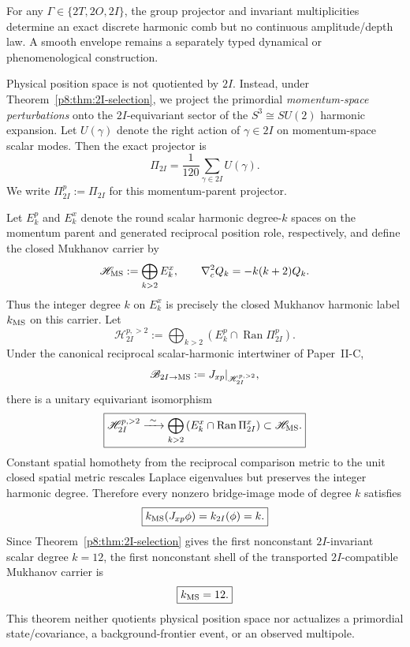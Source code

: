 \documentclass[12pt,a4paper]{article}
\begin{document}
\begin{remark}
\label{p8:rem:v236-no-finite-envelope}
For any \(\Gamma\in\{2T,2O,2I\}\), the group projector and invariant
multiplicities determine an exact discrete harmonic comb but no continuous
amplitude/depth law.  A smooth envelope remains a separately typed dynamical
or phenomenological construction.
\end{remark}


Physical position space is not quotiented by \(2I\).  Instead, under Theorem~\ref{p8:thm:2I-selection}, we project the primordial \emph{momentum-space perturbations} onto the \(2I\)-equivariant sector of the \(S^3\cong SU(2)\) harmonic expansion. Let \(U(\gamma)\) denote the right action of \(\gamma\in 2I\) on momentum-space scalar modes. Then the exact projector is
\begin{equation}
\label{p8:eq:2I-projector}
\Pi_{2I}
=
\frac{1}{120}\sum_{\gamma\in 2I} U(\gamma).
\end{equation}
We write $\Pi_{2I}^p:=\Pi_{2I}$ for this momentum-parent projector.

\begin{theorem}
\label{p8:thm:g30a-2i-mukhanov-bridge}
Let $E_k^p$ and $E_k^x$ denote the round scalar harmonic degree-$k$ spaces on
the momentum parent and generated reciprocal position role, respectively,
and define the closed Mukhanov carrier by
\[
 \mathscr H_{\rm MS}:=\bigoplus_{k>2}E_k^x,
 \qquad
 \nabla_c^2Q_k=-k(k+2)Q_k.
\]
Thus the integer degree $k$ on $E_k^x$ is precisely the closed Mukhanov
harmonic label $k_{\rm MS}$ on this carrier.  Let
\[
 \mathscr H_{2I}^{p,>2}
 :=\bigoplus_{k>2}\left(E_k^p\cap\operatorname{Ran}\Pi_{2I}^p\right).
\]
Under the canonical reciprocal scalar-harmonic intertwiner of Paper~II-C,
\[
 \mathscr B_{2I\to\rm MS}
 :=J_{xp}|_{\mathscr H_{2I}^{p,>2}},
\]
there is a unitary equivariant isomorphism
\[
 \boxed{
 \mathscr H_{2I}^{p,>2}
 \xrightarrow{\ \sim\ }
 \bigoplus_{k>2}\left(E_k^x\cap\operatorname{Ran}\Pi_{2I}^x\right)
 \subset\mathscr H_{\rm MS}.}
\]
Constant spatial homothety from the reciprocal comparison metric to the unit
closed spatial metric rescales Laplace eigenvalues but preserves the integer
harmonic degree.  Therefore every nonzero bridge-image mode of degree $k$
satisfies
\[
 \boxed{k_{\rm MS}(J_{xp}\phi)=k_{2I}(\phi)=k.}
\]
Since Theorem~\ref{p8:thm:2I-selection} gives the first nonconstant
$2I$-invariant scalar degree $k=12$, the first nonconstant shell of the
transported $2I$-compatible Mukhanov carrier is
\[
 \boxed{k_{\rm MS}=12.}
\]
This theorem neither quotients physical position space nor actualizes a
primordial state/covariance, a background-frontier event, or an observed
multipole.
\end{theorem}
\end{document}
